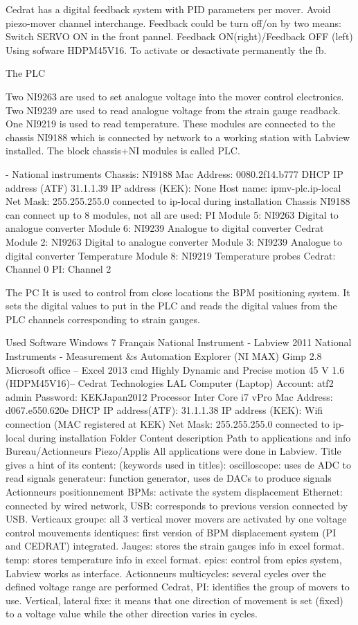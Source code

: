 \documentclass[a4paper,11pt]{book}
\begin{document}
Cedrat has a digital feedback system with PID parameters per mover. Avoid piezo-mover channel interchange. Feedback could be turn off/on by two means:
Switch SERVO ON in the front pannel. Feedback ON(right)/Feedback OFF (left)
Using sofware  HDPM45V16. To activate or desactivate permanently the fb.

The PLC

Two NI9263 are used to set analogue voltage into the mover control electronics.
Two NI9239 are used to read analogue voltage from the strain gauge readback.
One NI9219 is used to read temperature.
These modules are connected to the chassis NI9188 which is connected by network to a working station with Labview installed.
The block chassis+NI modules is called PLC.

- National instruments Chassis: NI9188
Mac Address: 0080.2f14.b777
DHCP
IP address (ATF) 31.1.1.39
IP address (KEK): None
Host name: ipmv-plc.ip-local
Net Mask: 255.255.255.0
connected to ip-local during installation
Chassis NI9188 can connect up to 8 modules, not all are used:
PI
Module 5: NI9263 Digital to analogue converter
Module 6: NI9239 Analogue to digital converter
Cedrat
Module 2: NI9263 Digital to analogue converter
Module 3: NI9239 Analogue to digital converter
Temperature
Module 8: NI9219 Temperature probes
Cedrat: 	Channel 0
PI: 		Channel 2

The PC
It is used to control from close locations the BPM positioning system. It sets the digital values to put in the PLC and reads the digital values from the PLC channels corresponding to strain gauges.

Used Software
Windows 7 Français
National Instrument - Labview 2011
National Instruments - Measurement $\&$s Automation Explorer (NI MAX)
Gimp 2.8
Microsoft office – Excel 2013
cmd
Highly Dynamic and Precise motion 45 V 1.6 (HDPM45V16)– Cedrat Technologies
LAL Computer (Laptop)
Account: atf2 admin
Password: KEKJapan2012
Processor Inter Core i7 vPro
Mac Address: d067.e550.620e
DHCP
IP address(ATF): 31.1.1.38
IP address (KEK): Wifi connection (MAC registered at KEK)
Net Mask: 255.255.255.0
connected to ip-local during installation
Folder Content description
Path to applications and info
		    Bureau/Actionneurs Piezo/Applis
All applications were done in Labview. Title gives a hint of its content:
	(keywords used in titles):
oscilloscope: uses de ADC to read signals
generateur: function generator, uses de DACs to produce signals
Actionneurs positionnement BPMs: activate the system displacement
Ethernet: connected by wired network,
USB: corresponds to previous version connected by USB.
Verticaux groupe: all 3 vertical mover movers are activated by one voltage control
 mouvements identiques: first version of BPM displacement system (PI and CEDRAT) integrated.
Jauges: stores the strain gauges info in excel format.
temp: stores temperature info in excel format.
epics: control from epics system, Labview works as interface.
Actionneurs multicycles: several cycles over the defined voltage range are performed
Cedrat, PI: identifies the group of movers to use.
Vertical, lateral fixe: it means that one direction of movement is set (fixed) to a voltage value while the other direction varies in cycles.
\end{document}
